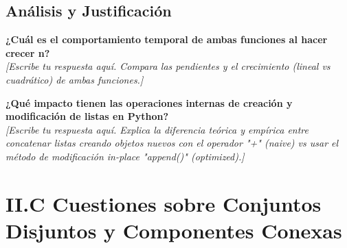 \documentclass[11pt, a4paper]{article}
\begin{document}
\begin{center}
\end{center}

\subsection*{Análisis y Justificación}

\textbf{¿Cuál es el comportamiento temporal de ambas funciones al hacer crecer n?} \\
\textit{[Escribe tu respuesta aquí. Compara las pendientes y el crecimiento (lineal vs cuadrático) de ambas funciones.]}

\vspace{1em}

\textbf{¿Qué impacto tienen las operaciones internas de creación y modificación de listas en Python?} \\
\textit{[Escribe tu respuesta aquí. Explica la diferencia teórica y empírica entre concatenar listas creando objetos nuevos con el operador "+" (naive) vs usar el método de modificación in-place "append()" (optimized).]}


\newpage
\section{II.C Cuestiones sobre Conjuntos Disjuntos y Componentes Conexas}
\end{document}

